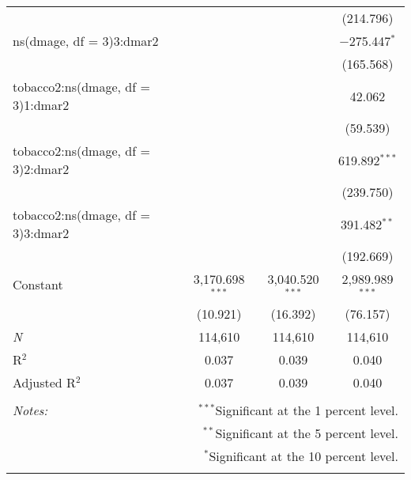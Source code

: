 \documentclass{article}
\begin{document}
\begin{table}[!htbp]
\begin{tabular}{lccc}
  &  &  & (214.796) \\ 
  ns(dmage, df = 3)3:dmar2 &  &  & $-$275.447$^{*}$ \\ 
  &  &  & (165.568) \\ 
  tobacco2:ns(dmage, df = 3)1:dmar2 &  &  & 42.062 \\ 
  &  &  & (59.539) \\ 
  tobacco2:ns(dmage, df = 3)2:dmar2 &  &  & 619.892$^{***}$ \\ 
  &  &  & (239.750) \\ 
  tobacco2:ns(dmage, df = 3)3:dmar2 &  &  & 391.482$^{**}$ \\ 
  &  &  & (192.669) \\ 
  Constant & 3,170.698$^{***}$ & 3,040.520$^{***}$ & 2,989.989$^{***}$ \\ 
  & (10.921) & (16.392) & (76.157) \\ 
 \textit{N} & 114,610 & 114,610 & 114,610 \\ 
R$^{2}$ & 0.037 & 0.039 & 0.040 \\ 
Adjusted R$^{2}$ & 0.037 & 0.039 & 0.040 \\ 
\hline 
\hline \\[-1.8ex] 
\textit{Notes:} & \multicolumn{3}{r}{$^{***}$Significant at the 1 percent level.} \\ 
 & \multicolumn{3}{r}{$^{**}$Significant at the 5 percent level.} \\ 
 & \multicolumn{3}{r}{$^{*}$Significant at the 10 percent level.} \\ 
\normalsize 
\end{tabular} 
\end{table} 
\end{document}
